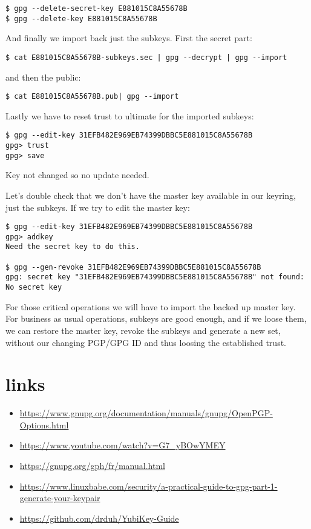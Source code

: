 \begin{verbatim}
$ gpg --delete-secret-key E881015C8A55678B
$ gpg --delete-key E881015C8A55678B
\end{verbatim}

And finally we import back just the subkeys. First the secret part:

\begin{verbatim}
$ cat E881015C8A55678B-subkeys.sec | gpg --decrypt | gpg --import
\end{verbatim}

and then the public:

\begin{verbatim}
$ cat E881015C8A55678B.pub| gpg --import
\end{verbatim}

Lastly we have to reset trust to ultimate for the imported subkeys:

\begin{verbatim}
$ gpg --edit-key 31EFB482E969EB74399DBBC5E881015C8A55678B
gpg> trust
gpg> save
\end{verbatim}
Key not changed so no update needed.

Let’s double check that we don’t have the master key available in our keyring, just the subkeys. If we try to edit the master key:

\begin{verbatim}
$ gpg --edit-key 31EFB482E969EB74399DBBC5E881015C8A55678B
gpg> addkey
Need the secret key to do this.

$ gpg --gen-revoke 31EFB482E969EB74399DBBC5E881015C8A55678B
gpg: secret key "31EFB482E969EB74399DBBC5E881015C8A55678B" not found: No secret key
\end{verbatim}

For those critical operations we will have to import the backed up master key. For business as usual operations, subkeys are good enough, and if we loose them, we can restore the master key, revoke the subkeys and generate a new set, without our changing PGP/GPG ID and thus loosing the established trust.


\section{links}
\begin{itemize}
\item
    \url{https://www.gnupg.org/documentation/manuals/gnupg/OpenPGP-Options.html}
\item \url{https://www.youtube.com/watch?v=G7_yBOwYMEY}
\item \url{https://gnupg.org/gph/fr/manual.html}
\item
    \url{https://www.linuxbabe.com/security/a-practical-guide-to-gpg-part-1-generate-your-keypair}

\item \url{https://github.com/drduh/YubiKey-Guide}
\end{itemize}



